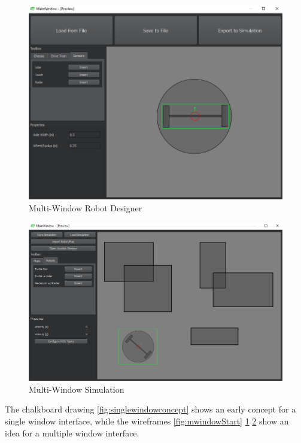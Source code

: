 \begin{figure}
	\begin{center}
	\includegraphics[width=\textwidth]{./images_design/RobotDesign.png}
	\caption{Multi-Window Robot Designer}
	\label{fig:mwindowRobot}
	\end{center}
\end{figure}

\begin{figure}
	\begin{center}
	\includegraphics[width=\textwidth]{./images_design/Simulation.png}
	\caption{Multi-Window Simulation}
	\label{fig:mwindowSimulation}
	\end{center}
\end{figure}

	
	The chalkboard drawing \ref{fig:singlewindowconcept} shows an early concept for a single window interface, while the wireframes \ref{fig:mwindowStart} \ref{fig:mwindowRobot} \ref{fig:mwindowSimulation} show an idea for a multiple window interface. 


